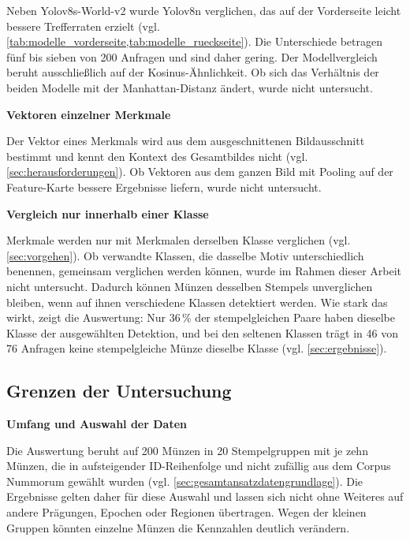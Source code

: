 Neben Yolov8s-World-v2 wurde Yolov8n verglichen, das auf der Vorderseite leicht bessere Trefferraten erzielt (vgl. \cref{tab:modelle_vorderseite,tab:modelle_rueckseite}). Die Unterschiede betragen fünf bis sieben von 200 Anfragen und sind daher gering. Der Modellvergleich beruht ausschließlich auf der Kosinus-Ähnlichkeit. Ob sich das Verhältnis der beiden Modelle mit der Manhattan-Distanz ändert, wurde nicht untersucht. 

\vspace{\baselineskip}

\noindent \textbf{Vektoren einzelner Merkmale} 

\noindent Der Vektor eines Merkmals wird aus dem ausgeschnittenen Bildausschnitt bestimmt und kennt den Kontext des Gesamtbildes nicht (vgl. \cref{sec:herausforderungen}). Ob Vektoren aus dem ganzen Bild mit Pooling auf der Feature-Karte bessere Ergebnisse liefern, wurde nicht untersucht.

\vspace{\baselineskip}

\noindent \textbf{Vergleich nur innerhalb einer Klasse} 

\noindent Merkmale werden nur mit Merkmalen derselben Klasse verglichen (vgl. \cref{sec:vorgehen}). Ob verwandte Klassen, die dasselbe Motiv unterschiedlich benennen, gemeinsam verglichen werden können, wurde im Rahmen dieser Arbeit nicht untersucht. Dadurch können Münzen desselben Stempels unverglichen bleiben, wenn auf ihnen verschiedene Klassen detektiert werden. Wie stark das wirkt, zeigt die Auswertung: Nur 36\,\% der stempelgleichen Paare haben dieselbe Klasse der ausgewählten Detektion, und bei den seltenen Klassen trägt in 46 von 76 Anfragen keine stempelgleiche Münze dieselbe Klasse (vgl. \cref{sec:ergebnisse}).

\subsection{Grenzen der Untersuchung}
\label{sec:grenzen-untersuchung}
\textbf{Umfang und Auswahl der Daten} 

\noindent Die Auswertung beruht auf 200 Münzen in 20 Stempelgruppen mit je zehn Münzen, die in aufsteigender ID-Reihenfolge und nicht zufällig aus dem Corpus Nummorum gewählt wurden (vgl. \cref{sec:gesamtansatzdatengrundlage}). Die Ergebnisse gelten daher für diese Auswahl und lassen sich nicht ohne Weiteres auf andere Prägungen, Epochen oder Regionen übertragen. Wegen der kleinen Gruppen könnten einzelne Münzen die Kennzahlen deutlich verändern.

